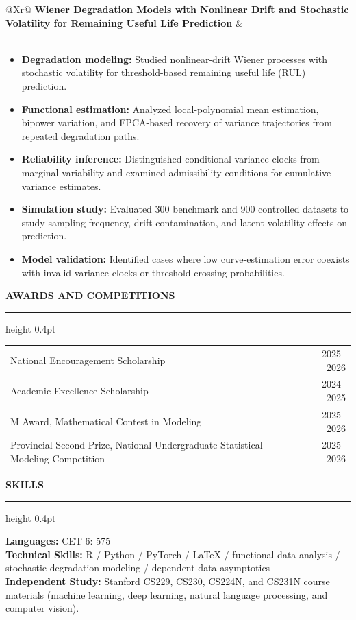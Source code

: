 \documentclass[11pt,a4paper]{article}
\newcommand{\cvsection}[1]{%
  \vspace{0.9em}%
  {\bfseries\normalsize\MakeUppercase{#1}}\par\vspace{0.18em}%
  \hrule height 0.4pt\vspace{0.45em}%
}
\newcommand{\cvbulletsstart}{\begin{itemize}[leftmargin=2.15em,topsep=0.3em,itemsep=0.22em,parsep=0pt]}
\newcommand{\cvbulletsend}{\end{itemize}}
\begin{document}
\vspace{0.3em}
\begin{tabularx}{\linewidth}{@{}Xr@{}}
  \textbf{Wiener Degradation Models with Nonlinear Drift and Stochastic Volatility for Remaining Useful Life Prediction} & \\
  \\
\end{tabularx}
\cvbulletsstart
  \item \textbf{Degradation modeling:} Studied nonlinear-drift Wiener processes with stochastic volatility for threshold-based remaining useful life (RUL) prediction.
  \item \textbf{Functional estimation:} Analyzed local-polynomial mean estimation, bipower variation, and FPCA-based recovery of variance trajectories from repeated degradation paths.
  \item \textbf{Reliability inference:} Distinguished conditional variance clocks from marginal variability and examined admissibility conditions for cumulative variance estimates.
  \item \textbf{Simulation study:} Evaluated 300 benchmark and 900 controlled datasets to study sampling frequency, drift contamination, and latent-volatility effects on prediction.
  \item \textbf{Model validation:} Identified cases where low curve-estimation error coexists with invalid variance clocks or threshold-crossing probabilities.
\cvbulletsend

\cvsection{Awards and Competitions}
\begin{tabularx}{\linewidth}{@{}Xr@{}}
  National Encouragement Scholarship & 2025--2026\\[0.16em]
  Academic Excellence Scholarship & 2024--2025\\[0.16em]
  M Award, Mathematical Contest in Modeling & 2025--2026\\[0.16em]
  Provincial Second Prize, National Undergraduate Statistical Modeling Competition &2025--2026\\[0.16em]
\end{tabularx}

\cvsection{Skills}
\textbf{Languages:} CET-6: 575\\[0.15em]
\textbf{Technical Skills:} R / Python / PyTorch / \LaTeX{} / functional data analysis / stochastic degradation modeling / dependent-data asymptotics\\[0.15em]
\textbf{Independent Study:} Stanford CS229, CS230, CS224N, and CS231N course materials (machine learning, deep learning, natural language processing, and computer vision).
\end{document}
